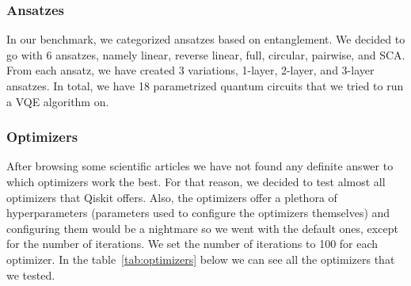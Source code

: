 \subsubsection{Ansatzes}
In our benchmark, we categorized ansatzes based on entanglement. We decided to go with 6 ansatzes, namely linear, reverse linear, full, circular, pairwise, and SCA. From each ansatz, we have created 3 variations, 1-layer, 2-layer, and 3-layer ansatzes. In total, we have 18 parametrized quantum circuits that we tried to run a VQE algorithm on.

\subsubsection{Optimizers}
After browsing some scientific articles we have not found any definite answer to which optimizers work the best. For that reason, we decided to test almost all optimizers that Qiskit offers.  Also, the optimizers offer a plethora of hyperparameters (parameters used to configure the optimizers themselves) and configuring them would be a nightmare so we went with the default ones, except for the number of iterations. We set the number of iterations to 100 for each optimizer. In the table~\ref{tab:optimizers} below we can see all the optimizers that we tested.

